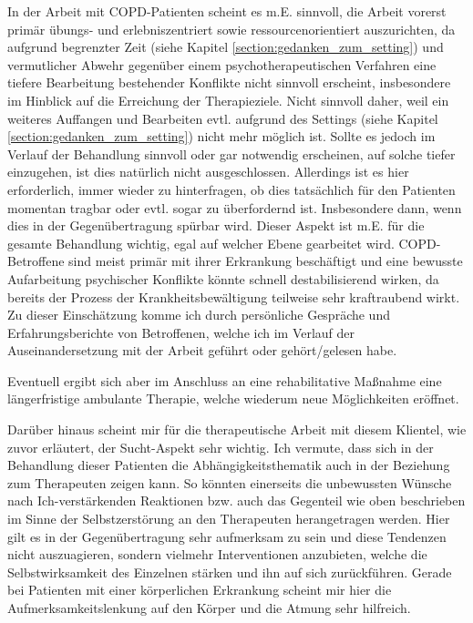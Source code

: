 In der Arbeit mit COPD-Patienten scheint es m.E. sinnvoll, die Arbeit vorerst primär übungs- und erlebniszentriert sowie ressourcenorientiert auszurichten, da aufgrund begrenzter Zeit (siehe Kapitel \ref{section:gedanken_zum_setting}) und vermutlicher Abwehr gegenüber einem psychotherapeutischen Verfahren eine tiefere Bearbeitung bestehender Konflikte nicht sinnvoll erscheint, insbesondere im Hinblick auf die Erreichung der Therapieziele. Nicht sinnvoll daher, weil ein weiteres Auffangen und Bearbeiten evtl. aufgrund des Settings (siehe Kapitel \ref{section:gedanken_zum_setting}) nicht mehr möglich ist. Sollte es jedoch im Verlauf der Behandlung sinnvoll oder gar notwendig erscheinen, auf solche tiefer einzugehen, ist dies natürlich nicht ausgeschlossen. Allerdings ist es hier erforderlich, immer wieder zu hinterfragen, ob dies tatsächlich für den Patienten momentan tragbar oder evtl. sogar zu überfordernd ist. Insbesondere dann, wenn dies in der Gegenübertragung spürbar wird. Dieser Aspekt ist m.E. für die gesamte Behandlung wichtig, egal auf welcher Ebene gearbeitet wird. COPD-Betroffene sind meist primär mit ihrer Erkrankung beschäftigt und eine bewusste Aufarbeitung psychischer Konflikte könnte schnell destabilisierend wirken, da bereits der Prozess der Krankheitsbewältigung teilweise sehr kraftraubend wirkt. Zu dieser Einschätzung komme ich durch persönliche Gespräche und Erfahrungsberichte von Betroffenen, welche ich im Verlauf der Auseinandersetzung mit der Arbeit geführt oder gehört/gelesen habe. 

Eventuell ergibt sich aber im Anschluss an eine rehabilitative Maßnahme eine längerfristige ambulante Therapie, welche wiederum neue Möglichkeiten eröffnet. 

Darüber hinaus scheint mir für die therapeutische Arbeit mit diesem Klientel, wie zuvor erläutert, der Sucht-Aspekt sehr wichtig. Ich vermute, dass sich in der Behandlung dieser Patienten die Abhängigkeitsthematik auch in der Beziehung zum Therapeuten zeigen kann. So könnten einerseits die unbewussten Wünsche nach Ich-verstärkenden Reaktionen bzw. auch das Gegenteil wie oben beschrieben im Sinne der Selbstzerstörung an den Therapeuten herangetragen werden. Hier gilt es in der Gegenübertragung sehr aufmerksam zu sein und diese Tendenzen nicht auszuagieren, sondern vielmehr Interventionen anzubieten, welche die Selbstwirksamkeit des Einzelnen stärken und ihn auf sich zurückführen. Gerade bei Patienten mit einer körperlichen Erkrankung scheint mir hier die Aufmerksamkeitslenkung auf den Körper und die Atmung sehr hilfreich. 

